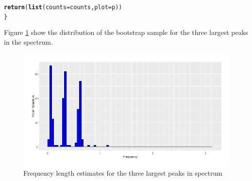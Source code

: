 \documentclass{article}\usepackage[]{graphicx}\usepackage[]{color}
\makeatletter
\newcommand{\hlstd}[1]{\textcolor[rgb]{0.345,0.345,0.345}{#1}}%
\newcommand{\hlkwc}[1]{\textcolor[rgb]{0.333,0.667,0.333}{#1}}%
\newcommand{\hlkwd}[1]{\textcolor[rgb]{0.737,0.353,0.396}{\textbf{#1}}}%
\newenvironment{kframe}{%
 \def\at@end@of@kframe{}%
 \ifinner\ifhmode%
  \def\at@end@of@kframe{\end{minipage}}%
  \begin{minipage}{\columnwidth}%
 \fi\fi%
 \def\FrameCommand##1{\hskip\@totalleftmargin \hskip-\fboxsep
 \colorbox{shadecolor}{##1}\hskip-\fboxsep
     \hskip-\linewidth \hskip-\@totalleftmargin \hskip\columnwidth}%
 \MakeFramed {\advance\hsize-\width
   \@totalleftmargin\z@ \linewidth\hsize
   \@setminipage}}%
 {\par\unskip\endMakeFramed%
 \at@end@of@kframe}
\newenvironment{knitrout}{}{} %
\makeatother
\begin{document}
\begin{knitrout}
\begin{kframe}
\begin{alltt}
  \hlkwd{return}\hlstd{(}\hlkwd{list}\hlstd{(}\hlkwc{counts} \hlstd{= counts,} \hlkwc{plot} \hlstd{= p))}
\hlstd{\}}
\end{alltt}
\end{kframe}
\end{knitrout}


Figure \ref{fig:SR.ciao} show the distribution of the bootstrap sample for the three largest peaks in the spectrum.


\begin{figure}[htbp]
\centering
\includegraphics[scale = 0.5]{Plots/SR_distr.png}
\caption{Frequency length estimates for the three largest peaks in spectrum}
\label{fig:SR.ciao}
\end{figure}
\end{document}
